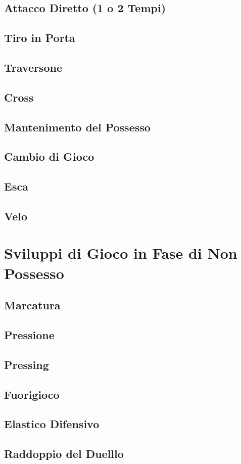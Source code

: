 \documentclass[../uefaC.tex]{subfiles}
\begin{document}
\subsection{Attacco Diretto (1 o 2 Tempi)}

\subsection{Tiro in Porta}

\subsection{Traversone}

\subsection{Cross}

\subsection{Mantenimento del Possesso}

\subsection{Cambio di Gioco}

\subsection{Esca}

\subsection{Velo}

\section{Sviluppi di Gioco in Fase di Non Possesso}

\subsection{Marcatura}

\subsection{Pressione}

\subsection{Pressing}

\subsection{Fuorigioco}

\subsection{Elastico Difensivo}

\subsection{Raddoppio del Duelllo}
\end{document}
